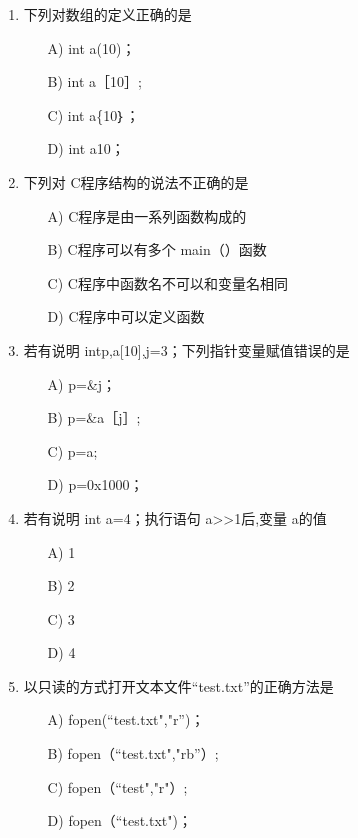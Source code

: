 \documentclass[12pt,a4paper]{article}
\begin{document}
\begin{enumerate}
    \item 下列对数组的定义正确的是
    \begin{enumerate}
        \item[A)] int a(10)；
        \item[B)] int a［10］;
        \item[C)] int a\{10｝；
        \item[D)] int a10；
    \end{enumerate}
    
    \item 下列对 C程序结构的说法不正确的是
    \begin{enumerate}
        \item[A)] C程序是由一系列函数构成的
        \item[B)] C程序可以有多个 main（）函数
        \item[C)] C程序中函数名不可以和变量名相同
        \item[D)] C程序中可以定义函数
    \end{enumerate}
    
    \item 若有说明 int\*p,a[10],j=3；下列指针变量赋值错误的是
    \begin{enumerate}
        \item[A)] p=\&j；
        \item[B)] p=\&a［j］;
        \item[C)] p=a;
        \item[D)] p=0x1000；
    \end{enumerate}
    
    \item 若有说明 int a=4；执行语句 a>>1后,变量 a的值
    \begin{enumerate}
        \item[A)] 1
        \item[B)] 2
        \item[C)] 3
        \item[D)] 4
    \end{enumerate}
    
    \item 以只读的方式打开文本文件“test.txt”的正确方法是
    \begin{enumerate}
        \item[A)] fopen(“test.txt","r”)；
        \item[B)] fopen（“test.txt","rb”）;
        \item[C)] fopen（“test","r"）;
        \item[D)] fopen（“test.txt")；
    \end{enumerate}
\end{enumerate}
\end{document}
